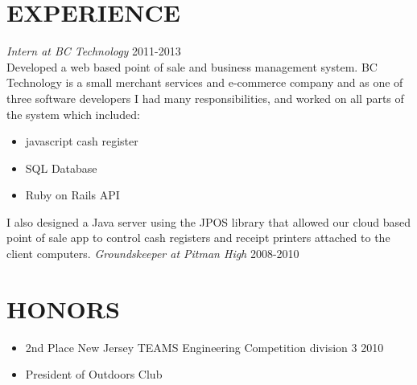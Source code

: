 \documentclass[line, margin]{res}
\begin{document}
\begin{resume}
    \section{EXPERIENCE}
    \textit{Intern at BC Technology} \hfill 2011-2013 \\
    Developed a web based point of sale and business management system.
    BC Technology is a small merchant services and e-commerce company and as one of three software developers
    I had many responsibilities, and worked on all parts of the system which included:
    \begin{itemize}
      \item javascript cash register
      \item SQL Database
      \item Ruby on Rails API
    \end{itemize}
    I also designed a Java server using the JPOS library that allowed our cloud based point of sale app
    to control cash registers and receipt printers attached to the client computers.
    \textit{Groundskeeper at Pitman High} \hfill 2008-2010 \\
    \section{HONORS}
    \begin{itemize}
      \item 2nd Place New Jersey TEAMS Engineering Competition division 3 2010
      \item President of Outdoors Club
    \end{itemize}
  \end{resume}
\end{document}
